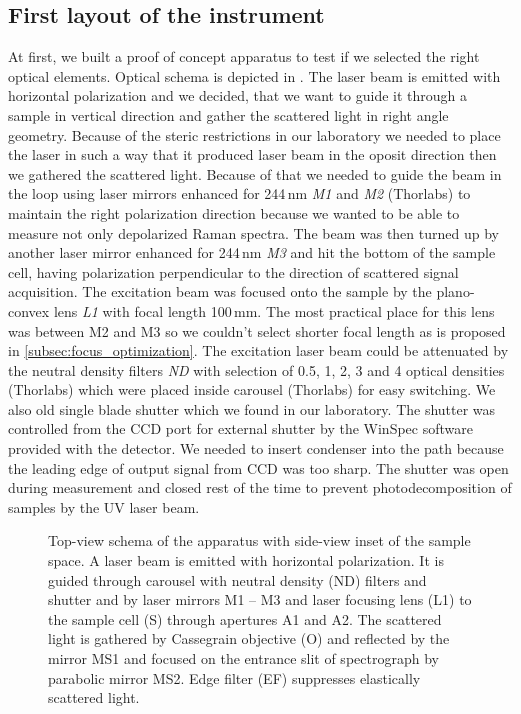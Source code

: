 \subsection{First layout of the instrument}
\label{first_layout}

At first, we built a proof of concept apparatus to test if we selected the
right optical elements. Optical schema is depicted in
.
The laser beam is emitted with horizontal polarization and we decided, that we
want to guide it through a sample in vertical direction and gather the
scattered light in right angle geometry. Because of the steric restrictions in
our laboratory we needed to place the laser in such a way that it produced
laser beam in the oposit direction then we gathered the scattered light.
Because of that we needed to guide the beam in the loop using laser mirrors
enhanced for 244\,nm \emph{M1} and \emph{M2} (Thorlabs) to maintain the right
polarization direction because we wanted to be able to measure not only
depolarized Raman spectra. The beam was then turned up by another laser mirror
enhanced for 244\,nm \emph{M3} and hit the bottom of the sample cell, having
polarization perpendicular to the direction of scattered signal acquisition.
The excitation beam was focused onto the sample by the plano-convex lens
\emph{L1} with focal length 100\,mm. The most practical place for this lens
was between M2 and M3 so we couldn't select shorter focal length as is proposed
in \cref{subsec:focus_optimization}. The excitation laser beam could be attenuated by
the neutral density filters \emph{ND} with selection of 0.5, 1, 2, 3 and 4
optical densities (Thorlabs) which were placed inside carousel (Thorlabs) for
easy switching. We also old single blade shutter which we found in our
laboratory. The shutter was controlled from the CCD port for external shutter
by the WinSpec software provided with the detector. We needed to insert
condenser into the path because the leading edge of output signal from CCD was
too sharp. The shutter was open during measurement and closed rest of the time
to prevent photodecomposition of samples by the UV laser beam.

\begin{figure}
	\centering
	
	\caption{Top-view schema of the apparatus with side-view inset of the sample
		space. A laser beam is emitted with horizontal polarization. It is guided
		through carousel with neutral density (ND) filters and shutter and by laser
		mirrors M1 -- M3 and laser focusing lens (L1) to the sample cell (S)
		through apertures A1 and A2. The scattered light is gathered by Cassegrain
		objective (O) and reflected by the mirror MS1 and focused on the entrance
		slit of spectrograph by parabolic mirror MS2. Edge filter (EF) suppresses
		elastically scattered light.}
	\label{\figlabel{initial_layout:apparatus_schema}}
\end{figure}

